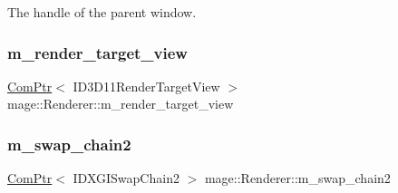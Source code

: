 The handle of the parent window. \hypertarget{classmage_1_1_renderer_a36ed728d4d5f55bc6f248066b2dd0a43}{}\label{classmage_1_1_renderer_a36ed728d4d5f55bc6f248066b2dd0a43} 
\subsubsection{\texorpdfstring{m\+\_\+render\+\_\+target\+\_\+view}{m\_render\_target\_view}}
{\footnotesize\ttfamily \hyperlink{namespacemage_ae74f374780900893caa5555d1031fd79}{Com\+Ptr}$<$ I\+D3\+D11\+Render\+Target\+View $>$ mage\+::\+Renderer\+::m\+\_\+render\+\_\+target\+\_\+view\hspace{0.3cm}{\ttfamily [protected]}}

\hypertarget{classmage_1_1_renderer_a96a55ac9d739141f6ea6692347134eec}{}\label{classmage_1_1_renderer_a96a55ac9d739141f6ea6692347134eec} 
\subsubsection{\texorpdfstring{m\+\_\+swap\+\_\+chain2}{m\_swap\_chain2}}
{\footnotesize\ttfamily \hyperlink{namespacemage_ae74f374780900893caa5555d1031fd79}{Com\+Ptr}$<$ I\+D\+X\+G\+I\+Swap\+Chain2 $>$ mage\+::\+Renderer\+::m\+\_\+swap\+\_\+chain2\hspace{0.3cm}{\ttfamily [protected]}}

